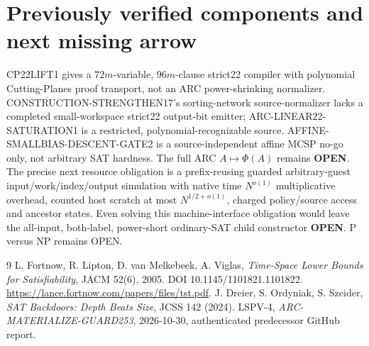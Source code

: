 \documentclass[10pt]{article}
\begin{document}
\section{Previously verified components and next missing arrow}
CP22LIFT1 gives a $72m$-variable, $96m$-clause strict22 compiler with polynomial Cutting-Planes proof transport, not an ARC power-shrinking normalizer. CONSTRUCTION-STRENGTHEN17's sorting-network source-normalizer lacks a completed small-workspace strict22 output-bit emitter; ARC-LINEAR22-SATURATION1 is a restricted, polynomial-recognizable source. AFFINE-SMALLBIAS-DESCENT-GATE2 is a source-independent affine MCSP no-go only, not arbitrary SAT hardness. The full ARC $A\mapsto\Phi(A)$ remains \textbf{OPEN}. The precise next resource obligation is a prefix-reusing guarded arbitrary-guest input/work/index/output simulation with native time $N^{o(1)}$ multiplicative overhead, counted host scratch at most $N^{1/2+o(1)}$, charged policy/source access and ancestor states. Even solving this machine-interface obligation would leave the all-input, both-label, power-short ordinary-SAT child constructor \textbf{OPEN}. P versus NP remains OPEN.

\begin{thebibliography}{9}
 L. Fortnow, R. Lipton, D. van Melkebeek, A. Viglas, \emph{Time-Space Lower Bounds for Satisfiability}, JACM 52(6), 2005. DOI 10.1145/1101821.1101822. \url{https://lance.fortnow.com/papers/files/tst.pdf}.
 J. Dreier, S. Ordyniak, S. Szeider, \emph{SAT Backdoors: Depth Beats Size}, JCSS 142 (2024).
 LSPV-4, \emph{ARC-MATERIALIZE-GUARD253}, 2026-10-30, authenticated predecessor GitHub report.
\end{thebibliography}
\end{document}
